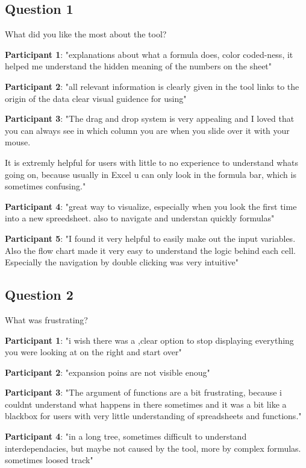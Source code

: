 \subsection*{Question 1}
What did you like the most about the tool?


\textbf{Participant 1}: "explanations about what a formula does, color coded-ness, it helped me understand the hidden meaning of the numbers on the sheet"


\textbf{Participant 2}: "all relevant information is clearly given in the tool
links to the origin of the data 
clear visual guidence for using"


\textbf{Participant 3}: "The drag and drop system is very appealing and I loved that you can always see in which column you are when you slide over it with your mouse.

It is extremly helpful for users with little to no experience to understand whats going on, because usually in Excel u can only look in the formula bar, which is sometimes confusing."


\textbf{Participant 4}: "great way to visualize, especially when you look the first time into a new spreedsheet. also to navigate and understan quickly formulas"


\textbf{Participant 5}: "I found it very helpful to easily make out the input variables. Also the flow chart made it very easy to understand the logic behind each cell. Especially the navigation by double clicking was very intuitive"

\subsection*{Question 2}
What was frustrating?

\textbf{Participant 1}: "i wish there was a ,clear option to stop displaying everything you were looking at on the right and start over"


\textbf{Participant 2}: "expansion poins are not visible enoug"


\textbf{Participant 3}: "The argument of functions are a bit frustrating, because i couldnt understand what happens in there sometimes and it was a bit like a blackbox for users with very little understanding of spreadsheets and functions."


\textbf{Participant 4}: "in a long tree, sometimes difficult to understand interdependacies, but maybe not caused by the tool, more by complex formulas. sometimes loosed track"


